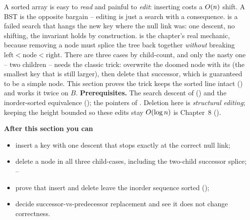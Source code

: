 \begin{topicintro}
A sorted array is easy to \emph{read} and painful to \emph{edit}: inserting costs a $O(n)$ shift.
A BST is the opposite bargain -- editing is just a search with a consequence.  is a
failed search that hangs the new key where the null link was: one descent, no shifting, the invariant
holds by construction.  is the chapter's real mechanic, because removing a node must
splice the tree back together \emph{without} breaking $\text{left}<\text{node}<\text{right}$. There
are three cases by child-count, and only the nasty one -- two children -- needs the classic trick:
overwrite the doomed node with its  (the smallest key that is still larger),
then delete that successor, which is guaranteed to be a simple node. This section proves the trick
keeps the sorted line intact () and works it twice on $B$.
\textbf{Prerequisites.} The search descent of  () and the
inorder-sorted equivalence (); the  pointers of .
Deletion here is \emph{structural editing}; keeping the height bounded so these edits stay
$O(\log n)$ is Chapter~8 ().

\textbf{After this section you can}
\begin{itemize}[nosep]
  \item insert a key with one descent that stops exactly at the correct null link; \hfill{}
  \item delete a node in all three child-cases, including the two-child successor splice; \hfill{}--
  \item prove that insert and delete leave the inorder sequence sorted (); \hfill{}
  \item decide successor-vs-predecessor replacement and see it does not change correctness. \hfill{}
\end{itemize}
\end{topicintro}

